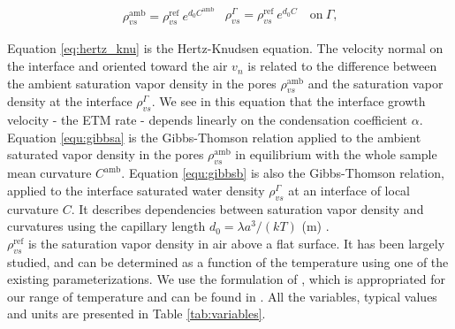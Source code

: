 \documentclass[draft,ms]{agujournal2019}
\begin{document}
\begin{subequations}
\begin{align}
\label{equ:gibbsa}
    \rho_{vs}^{\mathrm{amb}}=\rho_{vs}^{\mathrm{ref}}\ e^{d_0 C^{\mathrm{amb}}}
\end{align}
\begin{align}
\label{equ:gibbsb}
    \rho_{vs}^{\Gamma}=\rho_{vs}^{\mathrm{ref}}\ e^{d_0 C} \quad \text{on}\ \Gamma\text{,} 
\end{align}
\end{subequations}

\noindent Equation \eqref{eq:hertz_knu} is the Hertz-Knudsen equation. The velocity normal on the interface and oriented toward the air $v_n$ is related to the difference between the ambient saturation vapor density in the pores $\rho_{vs}^{\mathrm{amb}}$ and the saturation vapor density at the interface $\rho_{vs}^{\Gamma}$. We see in this equation that the interface growth velocity - the ETM rate - depends linearly on the condensation coefficient $\alpha$.\\

\noindent Equation \eqref{equ:gibbsa} is the Gibbs-Thomson relation applied to the ambient saturated vapor density in the pores $\rho_{vs}^{\mathrm{amb}}$ in equilibrium with the whole sample mean curvature $C^{\mathrm{amb}}$. Equation \eqref{equ:gibbsb} is also the Gibbs-Thomson relation, applied to the interface saturated water density $\rho_{vs}^{\Gamma}$ at an interface of local curvature $C$. It describes dependencies between saturation vapor density and curvatures using the capillary length $d_0 = \lambda a^3/(k T)$ (m) \cite{kaempfer_phase-field_2009}.\\ 
  
 \noindent $\rho_{vs}^\mathrm{ref}$ is the saturation vapor density in air above a flat surface. It has been largely studied, and can be determined as a function of the temperature using one of the existing parameterizations. We use the formulation of , which is appropriated for our range of temperature and can be found in . All the variables, typical values and units are presented in Table \ref{tab:variables}.
\end{document}

